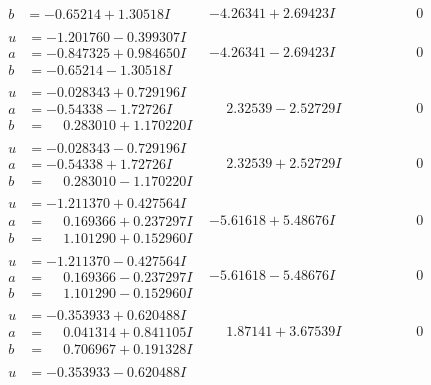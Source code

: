 \documentclass[1p]{elsarticle_modified}
\theoremstyle{definition}
\begin{document}
$$\begin{array}{c|c|c}
\begin{aligned}
b &= -0.65214 + 1.30518 I\end{aligned}
 & -4.26341 + 2.69423 I & \phantom{-0.000000 } 0 \\ \hline\begin{aligned}
u &= -1.201760 - 0.399307 I \\
a &= -0.847325 + 0.984650 I \\
b &= -0.65214 - 1.30518 I\end{aligned}
 & -4.26341 - 2.69423 I & \phantom{-0.000000 } 0 \\ \hline\begin{aligned}
u &= -0.028343 + 0.729196 I \\
a &= -0.54338 - 1.72726 I \\
b &= \phantom{-}0.283010 + 1.170220 I\end{aligned}
 & \phantom{-}2.32539 - 2.52729 I & \phantom{-0.000000 } 0 \\ \hline\begin{aligned}
u &= -0.028343 - 0.729196 I \\
a &= -0.54338 + 1.72726 I \\
b &= \phantom{-}0.283010 - 1.170220 I\end{aligned}
 & \phantom{-}2.32539 + 2.52729 I & \phantom{-0.000000 } 0 \\ \hline\begin{aligned}
u &= -1.211370 + 0.427564 I \\
a &= \phantom{-}0.169366 + 0.237297 I \\
b &= \phantom{-}1.101290 + 0.152960 I\end{aligned}
 & -5.61618 + 5.48676 I & \phantom{-0.000000 } 0 \\ \hline\begin{aligned}
u &= -1.211370 - 0.427564 I \\
a &= \phantom{-}0.169366 - 0.237297 I \\
b &= \phantom{-}1.101290 - 0.152960 I\end{aligned}
 & -5.61618 - 5.48676 I & \phantom{-0.000000 } 0 \\ \hline\begin{aligned}
u &= -0.353933 + 0.620488 I \\
a &= \phantom{-}0.041314 + 0.841105 I \\
b &= \phantom{-}0.706967 + 0.191328 I\end{aligned}
 & \phantom{-}1.87141 + 3.67539 I & \phantom{-0.000000 } 0 \\ \hline\begin{aligned}
u &= -0.353933 - 0.620488 I \\

\end{aligned}
\end{array}$$
\end{document}
